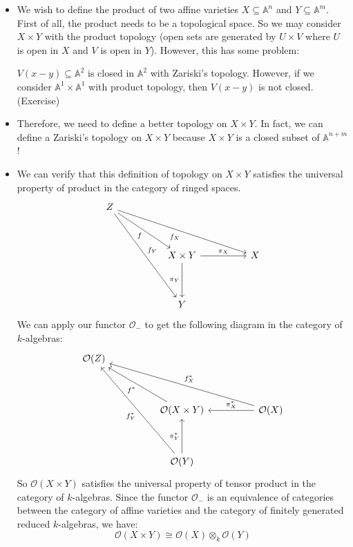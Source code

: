 \documentclass[15pt]{scrartcl}
\newcommand{\A}{\mathbb{A}}
\newcommand{\cO}{\mathcal{O}}
\begin{document}
\begin{itemize}
    \subsection{Product of affine Varieties}
    \item We wish to define the product of two affine varieties $X\subseteq \A^n$ and $Y\subseteq \A^m$. First of all, the product needs to be a topological space. So we may consider $X\times Y$ with the product topology (open sets are generated by $U\times V$ where $U$ is open in $X$ and $V$ is open in $Y$). However, this has some problem: 
    \begin{example}
        $V(x-y)\subseteq \A^2$ is closed in $\A^2$ with Zariski's topology. However, if we consider $\A^1\times \A^1$ with product topology, then $V(x-y)$ is not closed. (Exercise)
    \end{example}
    \item Therefore, we need to define a better topology on $X\times Y$. In fact, we can define a Zariski's topology on $X\times Y$ because $X\times Y$ is a closed subset of $\A^{n+m}$! 
    \item We can verify that this definition of topology on $X\times Y$ satisfies the universal property of product in the category of ringed spaces. 
\[\begin{tikzcd}
	Z \\
	\\
	&& {X\times Y} && X \\
	\\
	&& Y
	\arrow["f"', from=1-1, to=3-3]
	\arrow["{f_X}"', from=1-1, to=3-5]
	\arrow["{f_Y}", from=1-1, to=5-3]
	\arrow["{\pi_X}", from=3-3, to=3-5]
	\arrow["{\pi_Y}"', from=3-3, to=5-3]
\end{tikzcd}\]
We can apply our functor $\cO_{-}$ to get the following diagram in the category of $k$-algebras:
\[\begin{tikzcd}
	{\mathcal{O}(Z)} \\
	\\
	&& {\mathcal{O}(X\times Y)} && {\mathcal{O}(X)} \\
	\\
	&& {\mathcal{O}(Y)}
	\arrow["{f^*}", from=3-3, to=1-1]
	\arrow["{f_X^*}"', from=3-5, to=1-1]
	\arrow["{\pi_X^*}"', from=3-5, to=3-3]
	\arrow["{f_Y^*}", from=5-3, to=1-1]
	\arrow["{\pi_Y^*}", from=5-3, to=3-3]
\end{tikzcd}\]
So $\cO(X\times Y)$ satisfies the universal property of tensor product in the category of $k$-algebras. Since the functor $\cO_{-}$ is an equivalence of categories between the category of affine varieties and the category of finitely generated reduced $k$-algebras, we have:
\[\mathcal{O}(X\times Y)\cong \mathcal{O}(X)\otimes_k \mathcal{O}(Y)\]

\end{itemize}
\end{document}
